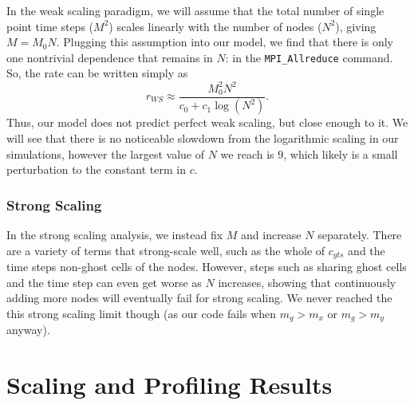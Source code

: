 \documentclass{article}
\begin{document}
In the weak scaling paradigm, we will assume that the total number of single point time steps ($M^2$) scales linearly with the number of nodes ($N^2$), giving $M = M_0 N$. Plugging this assumption into our model, we find that there is only one nontrivial dependence that remains in $N$: in the \texttt{MPI\_Allreduce} command. So, the rate can be written simply as
\begin{equation*}
    r_{WS} \approx \frac{M_0^2 N^2}{c_0 + c_1 \log(N^2)}.
\end{equation*}
Thus, our model does not predict perfect weak scaling, but close enough to it. We will see that there is no noticeable slowdown from the logarithmic scaling in our simulations, however the largest value of $N$ we reach is $9$, which likely is a small perturbation to the constant term in $c$.  

\subsubsection{Strong Scaling} 
In the strong scaling analysis, we instead fix $M$ and increase $N$ separately. There are a variety of terms that strong-scale well, such as the whole of $c_{gts}$ and the time steps non-ghost cells of the nodes. However, steps such as sharing ghost cells and the time step can even get worse as $N$ increases, showing that continuously adding more nodes will eventually fail for strong scaling. We never reached the this strong scaling limit though (as our code fails when $m_g > m_x$ or $m_g>m_y$ anyway).



\section{Scaling and Profiling Results}
\end{document}
